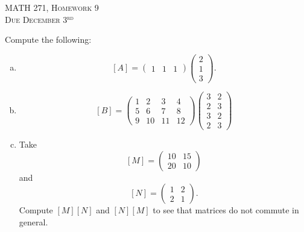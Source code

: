 \documentclass[12pt]{article} %
\begin{document}
\begin{center}
   \textsc{\large MATH 271, Homework 9}\\
   \textsc{Due December 3$^\textrm{rd}$}
\end{center}
\vspace{.5cm}

\begin{problem}
Compute the following:
\begin{enumerate}[(a)]
    \item
    \[
    [A]=\begin{pmatrix} 1& 1& 1 \end{pmatrix}
    \begin{pmatrix} 2\\ 1\\ 3 \end{pmatrix}.
    \]
    \item
    \[
    [B]=\begin{pmatrix} 1& 2& 3& 4\\ 5& 6& 7& 8\\ 9& 10& 11& 12\end{pmatrix}
    \begin{pmatrix} 3& 2\\ 2& 3\\ 3& 2\\ 2& 3\end{pmatrix}
    \]
    \item Take
    \[
    [M]=\begin{pmatrix} 10& 15\\ 20& 10 \end{pmatrix}
    \]
    and
    \[
    [N]=\begin{pmatrix} 1 & 2\\ 2& 1\end{pmatrix}.
    \]
    Compute $[M][N]$ and $[N][M]$ to see that matrices do not commute in general.
\end{enumerate}
\end{problem}
\end{document}
